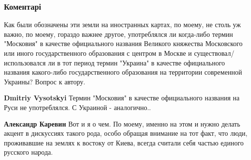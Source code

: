  
 
 
 
 
\subsubsection{Коментарі}
\label{sec:04_09_2021.fb.karevin_aleksandr.1.kuleba_moskovia.cmt}

\begin{itemize}
 

Как были обозначены эти земли на иностранных картах, по моему, не столь уж
важно, по моему, гораздо важнее другое, употреблялся ли когда-либо термин
"Московия" в качестве официального названия Великого княжества Московского или
иного государственного образования с центром в Москве и
существовал/использовался ли в тот период термин "Украина" в качестве
официального названия какого-либо государственного образования на территории
современной Украины? Вопрос к автору.

\begin{itemize}
 
\textbf{Dmitriy Vysotskyi} Термин "Московия" в качестве официального названия на Руси не употреблялся. С Украиной - аналогично..

 
\textbf{Александр Каревин} Вот и я о чем. По моему, именно на этом и нужно делать акцент в дискуссиях такого рода, особо обращая внимание на тот факт, что люди, проживавшие на землях к востоку от Киева, всегда считали себя частью единого русского народа.


\end{itemize}
\end{itemize}

